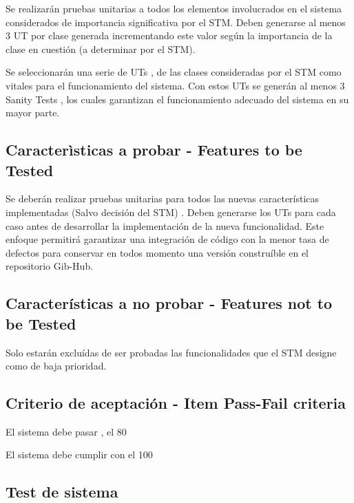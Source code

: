 Se realizarán pruebas unitarias a todos los elementos involucrados en el sistema considerados de importancia significativa por el STM. Deben generarse al menos 3 UT por clase generada incrementando este valor según la importancia de la clase en cuestión (a determinar por el STM).

	Se seleccionarán una serie de UTs , de las clases consideradas por el STM como vitales para el funcionamiento del sistema. Con estos UTs se generán al menos 3 Sanity Tests , los cuales garantizan el funcionamiento adecuado del sistema en su mayor parte.


\subsection{\textcolor[gray]{.2}{Caracterìsticas a probar - Features to be Tested}}

Se deberán realizar pruebas unitarias para todos las nuevas características implementadas (Salvo decisión del STM) . Deben generarse los UTs para cada caso antes de desarrollar la implementación de la nueva funcionalidad. Este enfoque permitirá garantizar una integración de código con la menor tasa de defectos para conservar en todos momento una versión construíble en el repositorio Gib-Hub.

\subsection{\textcolor[gray]{.2}{Características a no probar - Features not to be Tested }}

Solo estarán excluídas de ser probadas las funcionalidades que el STM designe como de baja prioridad. 

\subsection{\textcolor[gray]{.2}{Criterio de aceptación - Item Pass-Fail criteria }}

El sistema debe pasar , el 80 %

El sistema debe cumplir con el 100 %

\subsection{\textcolor[gray]{.2}{Test de sistema }}

